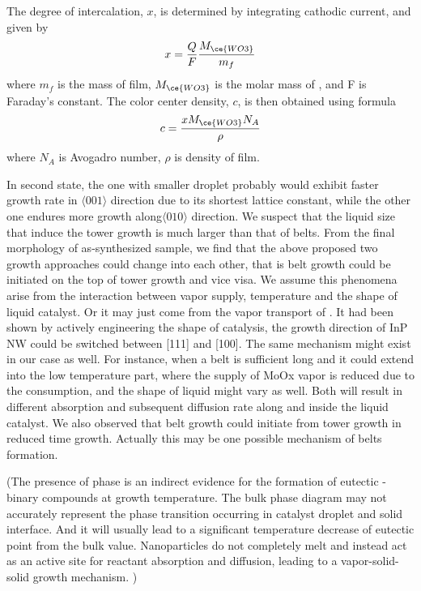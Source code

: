 The degree of  intercalation, $x$, is determined by integrating cathodic current, and given by
\begin{equation}
x = \frac{Q}{F}\frac{M_\ce{WO3}}{m_f}
\end{equation}
where $m_f$ is the mass of film, $M_\ce{WO3}$ is the molar mass of , and F is Faraday's constant.
The color center density, $c$, is then obtained using formula
\begin{equation}
c= \frac{x M_\ce{WO3}N_A}{\rho}
\end{equation}
where $N_A$ is Avogadro number, $\rho$ is density of film.


In second state, the one with smaller droplet probably would exhibit faster growth rate in $\langle001\rangle$ direction due to its shortest lattice constant, while the other one endures more growth along$\langle010\rangle$ direction. We suspect that the liquid size that induce the tower growth is much larger than that of belts. From the final morphology of as-synthesized sample, we find that the above proposed two growth approaches could change into each other, that is belt growth could be initiated on the top of tower growth and vice visa. We assume this phenomena arise from the interaction between vapor supply, temperature and the shape of liquid catalyst. Or it may just come from the vapor transport of .
It had been shown by actively engineering the shape of catalysis, the growth direction of  InP NW could be switched between [111] and [100].\cite{Wang2013c} The same mechanism might exist in our case as well. For instance, when a belt is sufficient long and it could extend into the low temperature part, where the supply of MoOx vapor is reduced due to the consumption, and the shape of liquid might vary as well. Both will result in different absorption and subsequent diffusion rate along and inside the liquid catalyst. We also observed that belt growth could initiate from tower growth in reduced time growth. Actually this may be one possible mechanism of belts formation.

(The presence of  phase is an indirect evidence for the formation of eutectic -  binary compounds at growth temperature. The bulk phase diagram may not accurately represent the phase transition occurring in catalyst droplet and solid interface. And it will usually lead to a significant temperature decrease of eutectic point from the bulk value. Nanoparticles do not completely melt and instead act as an active site for reactant absorption and diffusion, leading to a vapor-solid-solid growth mechanism. )

